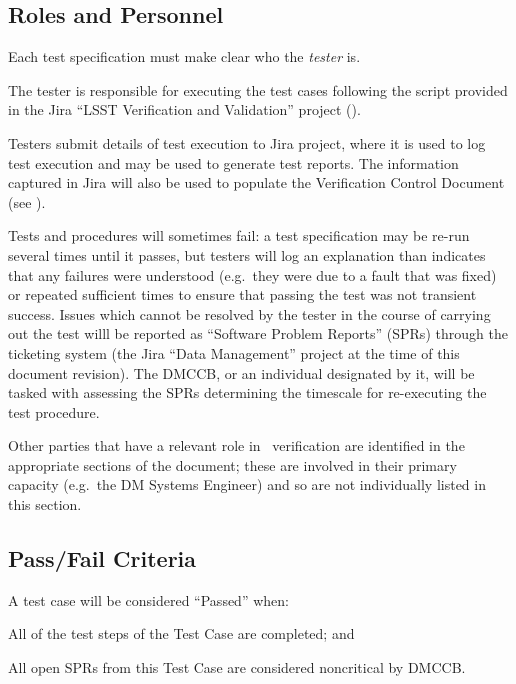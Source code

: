 \subsection{Roles and Personnel}
\label{sect:roles}

Each test specification must make clear who the \emph{tester} is.

The tester is responsible for executing the test cases following the script provided in the Jira ``LSST Verification and Validation'' project ().

Testers submit details of test execution to Jira project, where it is used to log test execution and may be used to generate test reports.
The information captured in Jira will also be used to populate the Verification Control Document (see ).

Tests and procedures will sometimes fail: a test specification may be re-run several times until it passes, but testers will log an explanation than indicates that any failures were understood (e.g.\ they were due to a fault that was fixed) or repeated sufficient times to ensure that passing the test was not transient success.
Issues which cannot be resolved by the tester in the course of carrying out the test willl be reported as ``Software Problem Reports'' (SPRs) through the \product{} ticketing system (the Jira ``Data Management'' project at the time of this document revision).
The DMCCB, or an individual designated by it, will be tasked with assessing the SPRs determining the timescale for re-executing the test procedure.

Other parties that have a relevant role in \product\ verification are identified in the appropriate sections of the document; these are involved in their primary capacity (e.g.\ the DM Systems Engineer) and so are not individually listed in this section.

\subsection{Pass/Fail Criteria}

A test case will be considered ``Passed'' when:

\begin{itemize_single}
\item{All of the test steps of the Test Case are completed; and}
\item{All open SPRs from this Test Case are considered noncritical by DMCCB.}
\end{itemize_single}

